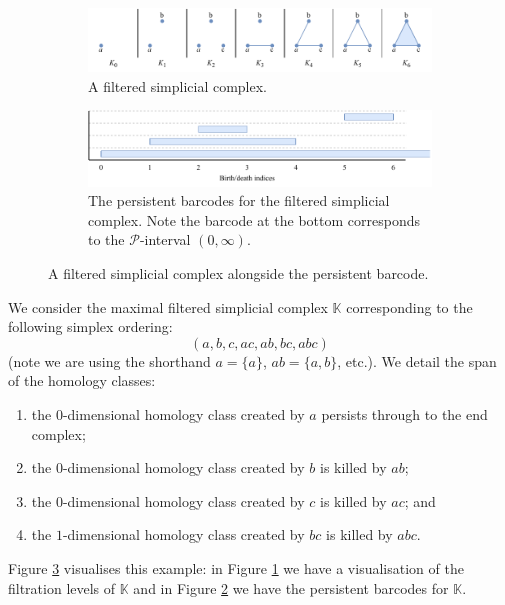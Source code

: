 \begin{figure}
    \centering
    \begin{subfigure}[b]{0.95\textwidth}
        \centering
        \includegraphics[width=\textwidth]{content/2-background/images/barcodes-ex-1}
        \caption{A filtered simplicial complex.}
        \label{fig:barcodes-ex-fil}
    \end{subfigure}
    \begin{subfigure}[b]{0.95\textwidth}
        \centering
        \includegraphics[width=\textwidth]{content/2-background/images/barcodes-ex-2}
        \caption{The persistent barcodes for the filtered simplicial complex. Note the barcode at the bottom corresponds to the $\mathcal P$-interval $(0, \infty)$.}
        \label{fig:barcodes-ex-barcodes}
    \end{subfigure}
    \caption{A filtered simplicial complex alongside the persistent barcode.}
    \label{fig:barcodes-ex}
\end{figure}

\begin{example}
    We consider the maximal filtered simplicial complex $\mathbb K$ corresponding to the following simplex ordering:
    \[ (a, b, c, ac, ab, bc, abc) \]
    (note we are using the shorthand $a = \{a\}$, $ab = \{a,b\}$, etc.). We detail the span of the homology classes:
    \begin{enumerate}
        \item the $0$-dimensional homology class created by $a$ persists through to the end complex;
        \item the $0$-dimensional homology class created by $b$ is killed by $ab$;
        \item the $0$-dimensional homology class created by $c$ is killed by $ac$; and
        \item the $1$-dimensional homology class created by $bc$ is killed by $abc$.
    \end{enumerate}
    Figure \ref{fig:barcodes-ex} visualises this example: in Figure \ref{fig:barcodes-ex-fil} we have a visualisation of the filtration levels of $\mathbb K$ and in Figure \ref{fig:barcodes-ex-barcodes} we have the persistent barcodes for $\mathbb K$.
\end{example}

